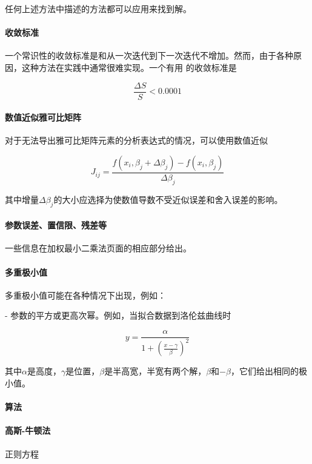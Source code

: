 \documentclass{ctexart}
\begin{document}
任何上述方法中描述的方法都可以应用来找到解。

\paragraph{收敛标准}

一个常识性的收敛标准是和从一次迭代到下一次迭代不增加。然而，由于各种原因，这种方法在实践中通常很难实现。一个有用 的收敛标准是

\[ \frac{\Delta S}{S} < 0.0001 \]

\paragraph{数值近似雅可比矩阵}

对于无法导出雅可比矩阵元素的分析表达式的情况，可以使用数值近似

\[ J_{ij} = \frac{f(x_i, \beta_j + \Delta \beta_j) - f(x_i, \beta_j)}{\Delta \beta_j} \]

其中增量$\Delta \beta_j$的大小应选择为使数值导数不受近似误差和舍入误差的影响。

\paragraph{参数误差、置信限、残差等}

一些信息在加权最小二乘法页面的相应部分给出。

\paragraph{多重极小值}

多重极小值可能在各种情况下出现，例如：

- 参数的平方或更高次幂。例如，当拟合数据到洛伦兹曲线时

\[ y = \frac{\alpha}{1 + \left( \frac{x - \gamma}{\beta} \right)^2} \]

其中$\alpha$是高度，$\gamma$是位置，$\beta$是半高宽，半宽有两个解，$\beta$和$-\beta$，它们给出相同的极小值。

\paragraph{算法}

\paragraph{高斯-牛顿法}

正则方程
\end{document}

